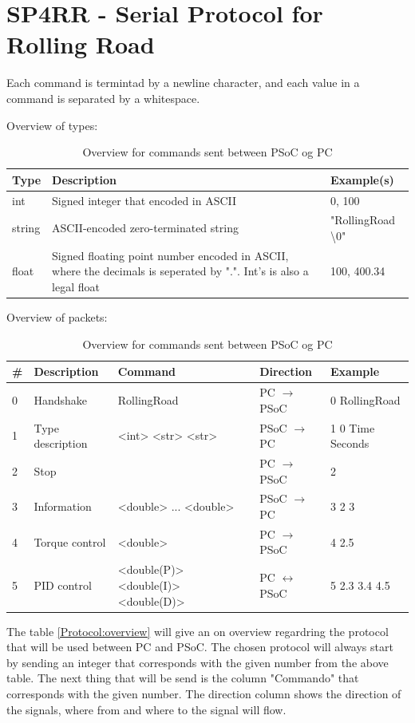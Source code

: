 \section{SP4RR - Serial Protocol for Rolling Road}
Each command is termintad by a newline character, and each value in a command is separated by a whitespace.

Overview of types:
\begin{table}[h!]
	\centering
	\label{Protocol:typeoverview}
	\begin{tabularx}{\linewidth}{p{1.5cm}Xp{3.5cm}}
		Type 	& Description 									& Example(s)    				\\\hline
		int  	& Signed integer that encoded in ASCII			& 0, 100 						\\
		string  & ASCII-encoded zero-terminated string 			& "RollingRoad \textbackslash0" \\
		float  	& Signed floating point number encoded in ASCII, where the decimals is seperated by ".". Int's is also a legal float      		& 100, 400.34 \\
	\end{tabularx}
	\caption{Overview for commands sent between PSoC og PC}
\end{table}

Overview of packets:
\begin{table}[h!]
	\centering
	\label{Protocol:overviewRR}
	\begin{tabular}{l|llll}
		\# & Description 		& Command    		& Direction             & Example     		\\\hline
		0  & Handshake   		& RollingRoad 		& PC $\rightarrow$ PSoC & 0 RollingRoad 	\\
		1  & Type description 	& <int> <str> <str> & PSoC $\rightarrow$ PC & 1 0 Time Seconds 	\\
		2  & Stop        		&            		& PC $\rightarrow$ PSoC	& 2        			\\
		3  & Information 		& <double> ... <double>	& PSoC $\rightarrow$ PC & 3 2 3 	    	\\
		4  & Torque control 	& <double>    			& PC $\rightarrow$ PSoC & 4 2.5  				\\
		5  & PID control        & <double(P)> <double(I)> <double(D)> & PC $\leftrightarrow$ PSoC & 5 2.3 3.4 4.5 \\
	\end{tabular}
	\caption{Overview for commands sent between PSoC og PC}
\end{table}

The table \ref{Protocol:overview} will give an on overview regardring the protocol that will be used between PC and PSoC. The chosen protocol will always start by sending an integer that corresponds with the given number from the above table.  The next thing that will be send is the column "Commando" that corresponds with the given number. The direction column shows the direction of the signals, where from and where to the signal will flow.


